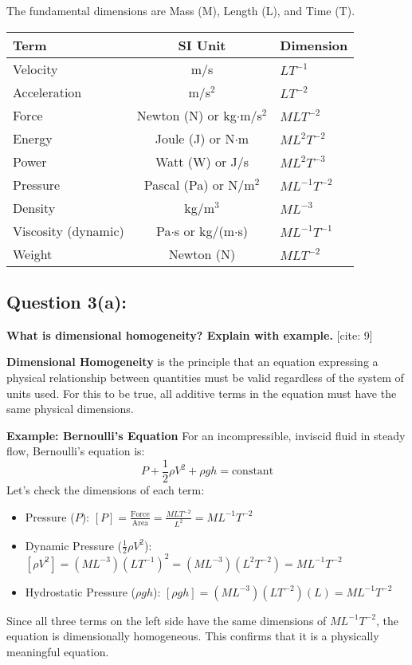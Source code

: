 \documentclass{article}
\begin{document}
The fundamental dimensions are Mass (M), Length (L), and Time (T).

\begin{center}
\begin{tabular}{|l|c|l|}
\hline
\textbf{Term} & \textbf{SI Unit} & \textbf{Dimension} \\
\hline
Velocity & m/s & $LT^{-1}$ \\
Acceleration & m/s$^2$ & $LT^{-2}$ \\
Force & Newton (N) or kg$\cdot$m/s$^2$ & $MLT^{-2}$ \\
Energy & Joule (J) or N$\cdot$m & $ML^2T^{-2}$ \\
Power & Watt (W) or J/s & $ML^2T^{-3}$ \\
Pressure & Pascal (Pa) or N/m$^2$ & $ML^{-1}T^{-2}$ \\
Density & kg/m$^3$ & $ML^{-3}$ \\
Viscosity (dynamic) & Pa$\cdot$s or kg/(m$\cdot$s) & $ML^{-1}T^{-1}$ \\
Weight & Newton (N) & $MLT^{-2}$ \\
\hline
\end{tabular}
\end{center}
\hrulefill

\subsection*{\textbf{Question 3(a):}}
\textbf{What is dimensional homogeneity? Explain with example.} [cite: 9]

\textbf{Dimensional Homogeneity} is the principle that an equation expressing a physical relationship between quantities must be valid regardless of the system of units used. For this to be true, all additive terms in the equation must have the same physical dimensions.

\textbf{Example: Bernoulli's Equation}
For an incompressible, inviscid fluid in steady flow, Bernoulli's equation is:
$$ P + \frac{1}{2}\rho V^2 + \rho g h = \text{constant} $$
Let's check the dimensions of each term:
\begin{itemize}
    \item Pressure ($P$): $[P] = \frac{\text{Force}}{\text{Area}} = \frac{MLT^{-2}}{L^2} = ML^{-1}T^{-2}$
    \item Dynamic Pressure ($\frac{1}{2}\rho V^2$): $[\rho V^2] = (ML^{-3})(LT^{-1})^2 = (ML^{-3})(L^2T^{-2}) = ML^{-1}T^{-2}$
    \item Hydrostatic Pressure ($\rho g h$): $[\rho g h] = (ML^{-3})(LT^{-2})(L) = ML^{-1}T^{-2}$
\end{itemize}
Since all three terms on the left side have the same dimensions of $ML^{-1}T^{-2}$, the equation is dimensionally homogeneous. This confirms that it is a physically meaningful equation.
\hrulefill
\end{document}
